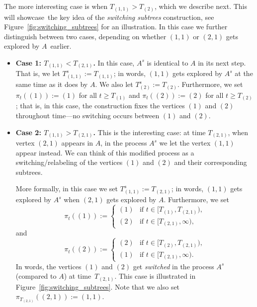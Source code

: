\documentclass[11pt]{article}
\numberwithin{equation}{section}
\theoremstyle{definition}
\begin{document}
The more interesting case is when $T_{(1,1)} > T_{(2)}$, which we describe next. This 
will showcase~the key idea of the \emph{switching subtrees} construction, see Figure~\ref{fig:switching_subtrees} for an illustration. 
In this case we further distinguish between two cases, depending on whether $(1,1)$ or $(2,1)$ gets explored by $A$~earlier. 
\begin{itemize}
\item \textbf{Case 1: $T_{(1,1)} < T_{(2,1)}$.} In this case, $A^{s}$ is identical to $A$ in its next step. 
That is, we let $T_{(1,1)}^{s} := T_{(1,1)}$; in words, $(1,1)$ gets explored by $A^{s}$ at the same time as it does by $A$. 
We also let $T^{s}_{(2)} := T_{(2)}$. 
Furthermore, 
we set 
$\pi_{t}((1)) := (1)$ for all $t \geq T_{(1)}$ 
and 
$\pi_{t}((2)) := (2)$ for all $t \geq T_{(2)}$; 
that is, in this case, the construction fixes the vertices $(1)$ and $(2)$ throughout time---no switching occurs between $(1)$ and $(2)$.

\item \textbf{Case 2: $T_{(1,1)} > T_{(2,1)}$.} This is the interesting case: at time $T_{(2,1)}$, when vertex $(2,1)$ appears in $A$, in the process $A^{s}$ we let the vertex $(1,1)$ appear instead. 
We can think of this modified process as a switching/relabeling of the vertices $(1)$ and $(2)$ and their corresponding subtrees. 

More formally, in this case we set $T_{(1,1)}^{s} := T_{(2,1)}$; 
in words, $(1,1)$ gets explored by $A^{s}$ when $(2,1)$ gets explored by $A$. 
Furthermore, we set 
\begin{equation*}
    \pi_{t} ((1)) := 
    \begin{cases}
        (1) &\mbox{if } t \in [T_{(1)}, T_{(2,1)}), \\
        (2) &\mbox{if } t \in [T_{(2,1)}, \infty),
    \end{cases}
\end{equation*}
and 
\begin{equation*}
    \pi_{t} ((2)) := 
    \begin{cases}
        (2) &\mbox{if } t \in [T_{(2)}, T_{(2,1)}), \\
        (1) &\mbox{if } t \in [T_{(2,1)}, \infty).
    \end{cases}
\end{equation*}
In words, the vertices $(1)$ and $(2)$ get \emph{switched} in the process $A^{s}$ (compared to $A$) at time~$T_{(2,1)}$. 
This case is illustrated in Figure~\ref{fig:switching_subtrees}. 
Note that we also set 
$\pi_{T_{(2,1)}} \left( (2,1) \right) := (1,1)$.
\end{itemize}
\end{document}
